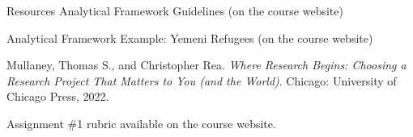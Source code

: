\documentclass[aspectratio=169,11pt]{beamer}
\begin{document}
\begin{frame}{Resources}
    Analytical Framework Guidelines (on the course website)\\
    \vspace{0.3cm}

    Analytical Framework Example: Yemeni Refugees (on the course website)\\
    \vspace{0.5cm}

    Mullaney, Thomas S., and Christopher Rea. \textit{Where Research Begins: Choosing a Research Project That Matters to You (and the World)}. Chicago: University of Chicago Press, 2022.\\
    \vspace{0.5cm}

    Assignment \#1 rubric available on the course website.
\end{frame}
\end{document}
